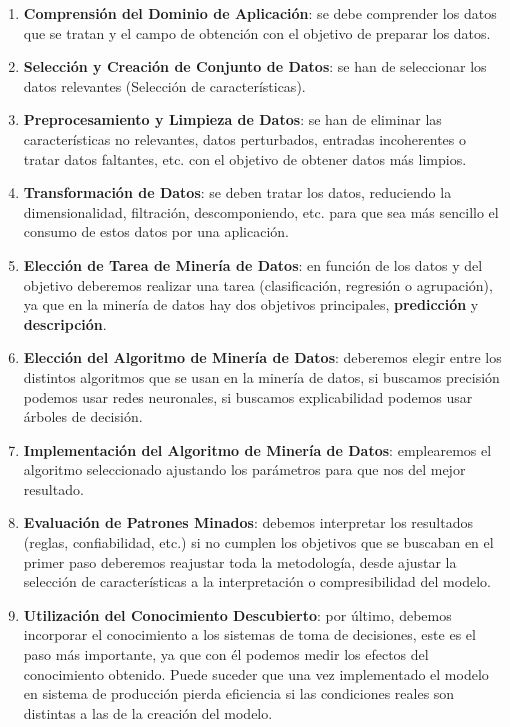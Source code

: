 \begin{enumerate}
    \item \textbf{Comprensión del Dominio de Aplicación}: se debe comprender los datos que se tratan y el campo de obtención con el objetivo de preparar los datos.
    \item \textbf{Selección y Creación de Conjunto de Datos}: se han de seleccionar los datos relevantes (Selección de características).
    \item \textbf{Preprocesamiento y Limpieza de Datos}: se han de eliminar las características no relevantes, datos perturbados, entradas incoherentes o tratar datos faltantes, etc. con el objetivo de obtener datos más limpios.
    \item \textbf{Transformación de Datos}: se deben tratar los datos, reduciendo la dimensionalidad, filtración, descomponiendo, etc. para que sea más sencillo el consumo de estos datos por una aplicación.
    \item \textbf{Elección de Tarea de Minería de Datos}: en función de los datos y del objetivo deberemos realizar una tarea (clasificación, regresión o agrupación), ya que en la minería de datos hay dos objetivos principales, \textbf{predicción} y \textbf{descripción}.
    \item \textbf{Elección del Algoritmo de Minería de Datos}: deberemos elegir entre los distintos algoritmos que se usan en la minería de datos, si buscamos precisión podemos usar redes neuronales, si buscamos explicabilidad podemos usar árboles de decisión.
    \item \textbf{Implementación del Algoritmo de Minería de Datos}: emplearemos el algoritmo seleccionado ajustando los parámetros para que nos del mejor resultado.
    \item \textbf{Evaluación de Patrones Minados}: debemos interpretar los resultados (reglas, confiabilidad, etc.) si no cumplen los objetivos que se buscaban en el primer paso deberemos reajustar toda la metodología, desde ajustar la selección de características a la interpretación o compresibilidad del modelo.
    \item \textbf{Utilización del Conocimiento Descubierto}: por último, debemos incorporar el conocimiento a los sistemas de toma de decisiones, este es el paso más importante, ya que con él podemos medir los efectos del conocimiento obtenido. Puede suceder que una vez implementado el modelo en sistema de producción pierda eficiencia si las condiciones reales son distintas a las de la creación del modelo.
\end{enumerate}


